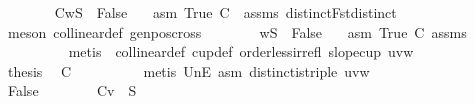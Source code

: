 \begin{isabellebody}
\ \ \ \ \ \ \isamarkupfalse%
\ C{}{\isacharcolon}{\kern0pt}{\isachardoublequoteopen}w{\isasymin}S{}\ {\isasymLongrightarrow}\ False{\isachardoublequoteclose}\ \isamarkupfalse%
\ {}\ asm\ True\ C{}\ {\isachardoublequoteopen}{}{\isachardoublequoteclose}\ assms{\isacharparenleft}{\kern0pt}{}{\isacharparenright}{\kern0pt}\ distinctFst{\isacharunderscore}{\kern0pt}distinct\isanewline
\ \ \ \ \ \ \ \ \isamarkupfalse%
\ {\isacharparenleft}{\kern0pt}meson\ collinear{}{\isacharunderscore}{\kern0pt}def\ genpos{\isacharunderscore}{\kern0pt}cross{}{\isacharparenright}{\kern0pt}\isanewline
\ \ \ \ \ \ \isamarkupfalse%
\ {\isachardoublequoteopen}w{\isasymin}S{}\ {\isasymLongrightarrow}\ False{\isachardoublequoteclose}\ \isamarkupfalse%
\ {}\ asm\ True\ C{}\ assms{\isacharparenleft}{\kern0pt}{}{\isacharparenright}{\kern0pt}\isanewline
\ \ \ \ \ \ \ \ \isamarkupfalse%
\ {\isacharparenleft}{\kern0pt}metis\ {\isachardoublequoteopen}{}{\isachardoublequoteclose}\ collinear{}{\isacharunderscore}{\kern0pt}def\ cup{}{\isacharunderscore}{\kern0pt}def\ order{\isacharunderscore}{\kern0pt}less{\isacharunderscore}{\kern0pt}irrefl\ slope{\isacharunderscore}{\kern0pt}cup{}\ uvw{\isacharparenleft}{\kern0pt}{}{\isacharparenright}{\kern0pt}{\isacharparenright}{\kern0pt}\isanewline
\ \ \ \ \ \ \isamarkupfalse%
\ \isamarkupfalse%
\ {\isacharquery}{\kern0pt}thesis\ \isamarkupfalse%
\ C{}\isanewline
\ \ \ \ \ \ \ \ \isamarkupfalse%
\ {\isacharparenleft}{\kern0pt}metis\ UnE\ asm{\isacharparenleft}{\kern0pt}{}{\isacharcomma}{\kern0pt}{}{\isacharcomma}{\kern0pt}{}{\isacharcomma}{\kern0pt}{}{\isacharparenright}{\kern0pt}\ distinct{\isacharunderscore}{\kern0pt}is{\isacharunderscore}{\kern0pt}triple\ uvw{\isacharparenleft}{\kern0pt}{}{\isacharparenright}{\kern0pt}{\isacharparenright}{\kern0pt}\ \ \ \ \ \isanewline
\ \ \ \ \isamarkupfalse%
\isanewline
\ \ \ \ \ \ \isamarkupfalse%
\ False\isanewline
\ \ \ \ \ \ \isamarkupfalse%
\ C{}{\isacharcolon}{\kern0pt}{\isachardoublequoteopen}v\ {\isasymin}\ S{}{\isachardoublequoteclose}\ \isamarkupfalse%

\end{isabellebody}
